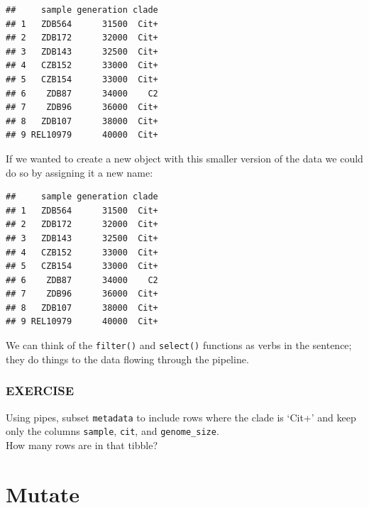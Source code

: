 \documentclass[]{book}
\newenvironment{Shaded}{\begin{snugshade}}{\end{snugshade}}
\newcommand{\KeywordTok}[1]{\textcolor[rgb]{0.13,0.29,0.53}{\textbf{#1}}}
\newcommand{\NormalTok}[1]{#1}
\newcommand{\OperatorTok}[1]{\textcolor[rgb]{0.81,0.36,0.00}{\textbf{#1}}}
\newcommand{\StringTok}[1]{\textcolor[rgb]{0.31,0.60,0.02}{#1}}
\begin{document}
\begin{verbatim}
##     sample generation clade
## 1   ZDB564      31500  Cit+
## 2   ZDB172      32000  Cit+
## 3   ZDB143      32500  Cit+
## 4   CZB152      33000  Cit+
## 5   CZB154      33000  Cit+
## 6    ZDB87      34000    C2
## 7    ZDB96      36000  Cit+
## 8   ZDB107      38000  Cit+
## 9 REL10979      40000  Cit+
\end{verbatim}

If we wanted to create a new object with this smaller version of the data we could do so by assigning it a new name:

\begin{Shaded}
\end{Shaded}

\begin{verbatim}
##     sample generation clade
## 1   ZDB564      31500  Cit+
## 2   ZDB172      32000  Cit+
## 3   ZDB143      32500  Cit+
## 4   CZB152      33000  Cit+
## 5   CZB154      33000  Cit+
## 6    ZDB87      34000    C2
## 7    ZDB96      36000  Cit+
## 8   ZDB107      38000  Cit+
## 9 REL10979      40000  Cit+
\end{verbatim}

We can think of the \texttt{filter()} and \texttt{select()} functions as verbs in the sentence; they do things to the data flowing through the pipeline.

\hypertarget{exercise-17}{%
\subsubsection*{EXERCISE}\label{exercise-17}}

Using pipes, subset \texttt{metadata} to include rows where the clade is `Cit+' and keep only the columns \texttt{sample}, \texttt{cit}, and \texttt{genome\_size}.\\
How many rows are in that tibble?

\hypertarget{mutate}{%
\section{Mutate}\label{mutate}}
\end{document}
